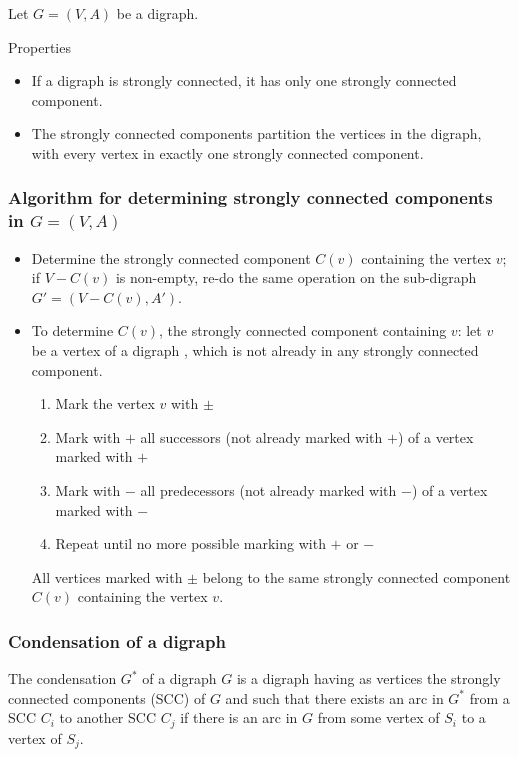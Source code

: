 \documentclass[aspectratio=43]{beamer}
\begin{document}
\begin{frame}
	Let $G=(V,A)$ be a digraph.

	\begin{theorem}{Properties}
	\begin{itemize}
	\item If a digraph is strongly connected, it has only one strongly connected component.
	\item The strongly connected components partition the vertices in the digraph, with every vertex in exactly one strongly connected component.
	\end{itemize}
	\end{theorem}
\end{frame}



\begin{frame}\frametitle{Algorithm for determining strongly connected components in $G=(V,A)$}
	\begin{itemize}
	\item Determine the strongly connected component $C(v)$ containing the vertex $v$; if $V-C(v)$ is non-empty, re-do the same operation on the sub-digraph $G'=(V-C(v),A')$.
	\item To determine $C(v)$, the strongly connected component containing $v$: let $v$ be a vertex of a digraph , which is not already in any strongly connected component. 
	\begin{enumerate}
	\item Mark the vertex $v$ with $\pm$
	\item Mark with $+$ all successors (not already marked with $+$) of a vertex marked with $+$
	\item Mark with $-$ all predecessors (not already marked with $-$) of a vertex marked with $-$
	\item Repeat until no more possible marking with $+$ or $-$
	\end{enumerate}
	All vertices marked with $\pm$ belong to the same strongly connected component $C(v)$ containing the vertex $v$.
	\end{itemize}
\end{frame}

\begin{frame}\frametitle{Condensation of a digraph}
	\begin{definition}
		The condensation $G^*$ of a digraph $G$ is a digraph having as vertices the strongly connected components (SCC) of $G$ and such that there exists an arc in $G^*$ from a SCC $C_i$ to another SCC $C_j$ if there is an arc in $G$ from some vertex of $S_i$ to a vertex of $S_j$.
	\end{definition}
\end{frame}
\end{document}
